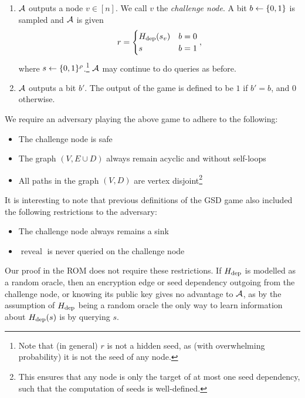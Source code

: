 \begin{definition}
\begin{enumerate}[1.]
\begin{itemize}
		      \end{itemize}
		\item $\mathcal{A}$ outputs a node $v \in [n]$. We call $v$ the \emph{challenge node}. A bit $b \leftarrow \{0, 1\}$ is sampled and $\mathcal{A}$ is given
		      \[
			      r = \begin{cases}
				      H_\mathrm{dep}(s_v) & b = 0 \\
				      s          & b = 1
			      \end{cases},
		      \]
		      where $s \leftarrow \{0, 1\}^\rho$.\footnote{Note that (in general) $r$ is not a hidden seed, as (with overwhelming probability) it is not the seed of any node.} $\mathcal{A}$ may continue to do queries as before.
		\item \label{def:sd-gsd-game-step-output} $\mathcal{A}$ outputs a bit $b'$. The output of the game is defined to be $1$ if $b' = b$, and $0$ otherwise.
	\end{enumerate}

	We require an adversary playing the above game to adhere to the following:
	\begin{itemize}
		\item The challenge node is safe
		\item The graph $(V, E \cup D)$ always remain acyclic and without self-loops
		\item All paths in the graph $(V, D)$ are vertex disjoint\footnote{This ensures that any node is only the target of at most one seed dependency, such that the computation of seeds is well-defined.}
	\end{itemize}
\end{definition}

It is interesting to note that previous definitions of the GSD game also included the following restrictions to the adversary:
\begin{itemize}
	\item The challenge node always remains a sink
	\item $\operatorname{reveal}$ is never queried on the challenge node
\end{itemize}
Our proof in the ROM does not require these restrictions. If $H_\mathrm{dep}$ is modelled as a random oracle, then an encryption edge or seed dependency outgoing from the challenge node, or knowing its public key gives no advantage to $\mathcal{A}$, as by the assumption of $H_\mathrm{dep}$ being a random oracle the only way to learn information about $H_\mathrm{dep}(s)$ is by querying $s$.

